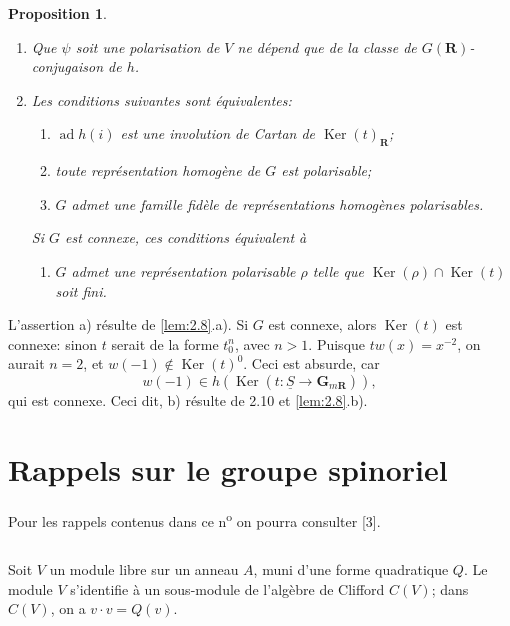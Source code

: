 \documentclass[11pt]{amsart}
\theoremstyle{plain}
\newtheorem{proposition}[theoreme]{Proposition}
\theoremstyle{definition}
\theoremstyle{remark}
\begin{document}
\begin{proposition}\label{prop:2.11}
\begin{enumerate}
\item[a)] Que $\psi$ soit une polarisation de $V$ ne d\'epend que de la classe de $G(\mathbf{R})$-conjugaison de $h$.
\item[b)] Les conditions suivantes sont \'equivalentes:
\begin{enumerate}
\item[(i)] $\operatorname{ad}h(i)$ est une involution de Cartan de $\operatorname{Ker}(t)_\mathbf{R}$;
\item[(ii)] toute repr\'esentation homog\`ene de $G$ est polarisable;
\item[(iii)] $G$ admet une famille fid\`ele de repr\'esentations homog\`enes polarisables.
\end{enumerate}
Si $G$ est connexe, ces conditions \'equivalent \`a
\begin{enumerate}
\item[(iii$'$)] $G$ admet une repr\'esentation polarisable $\rho$ telle que $\operatorname{Ker}(\rho)\cap\operatorname{Ker}(t)$ soit fini.
\end{enumerate}
\end{enumerate}
\end{proposition}

L'assertion a) r\'esulte de \ref{lem:2.8}.a). Si $G$ est connexe, alors $\operatorname{Ker}(t)$ est connexe: sinon $t$ serait de la forme $t_0^n$, avec $n>1$. Puisque $tw(x)=x^{-2}$, on aurait $n=2$, et $w(-1)\notin\operatorname{Ker}(t)^0$. Ceci est absurde, car
\begin{equation*}
w(-1)\in h(\operatorname{Ker}(t\colon\underline{S}\to\mathbf{G}_{m\mathbf{R}})),
\end{equation*}
qui est connexe. Ceci dit, b) r\'esulte de 2.10 et \ref{lem:2.8}.b).

\section{Rappels sur le groupe spinoriel}

Pour les rappels contenus dans ce n\textsuperscript{o} on pourra consulter [3].

\subsection*{}
Soit $V$ un module libre sur un anneau $A$, muni d'une forme quadratique $Q$. Le module $V$ s'identifie \`a un sous-module de l'alg\`ebre de Clifford $C(V)$; dans $C(V)$, on a $v\cdot v=Q(v)$.
\end{document}
